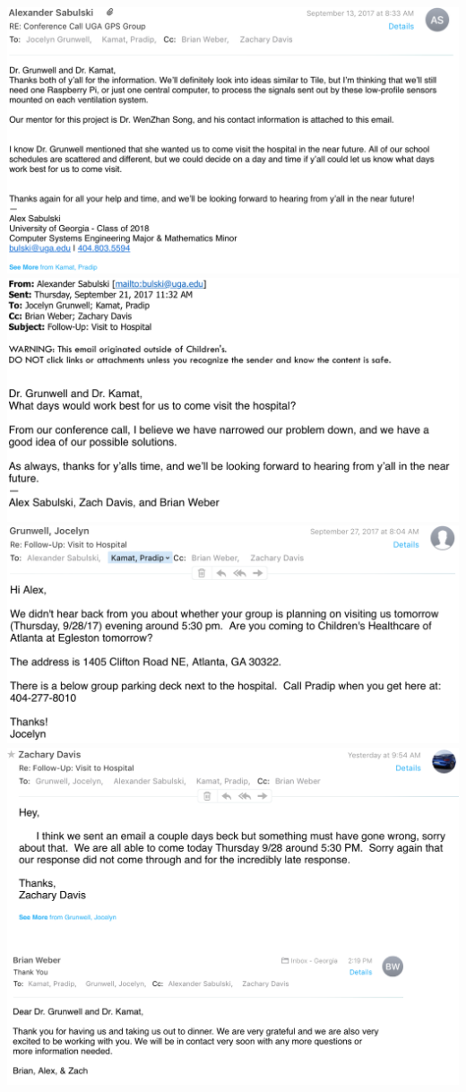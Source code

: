 \documentclass[12pt]{article}
\begin{document}
\begin{center}
		\includegraphics[scale=0.8]{9.png}\\
		\includegraphics[scale=0.8]{10.png}\\
		\includegraphics[scale=0.8]{12.png}\\
		\includegraphics[scale=0.8]{13.png}\\

\end{center}
\end{document}
